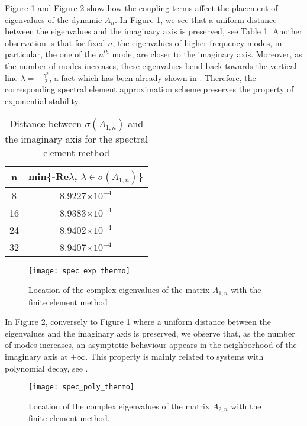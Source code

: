\documentclass [reqno]{amsart}
\begin{document}
Figure 1 and Figure 2 show how the coupling terms affect the placement of eigenvalues of the dynamic $A_{n}$. In Figure 1, we see that a uniform distance between the eigenvalues and the imaginary axis is preserved, see Table 1. Another observation is that for fixed $n$, the eigenvalues of higher frequency modes, in particular, the one of the $n^{th}$ mode, are closer to the imaginary axis. Moreover, as the number of modes increases, these eigenvalues bend back towards the vertical line $\lambda=-\frac{\gamma^2}{2}$, a fact which has been already shown in \cite{KBT1996}. Therefore, the corresponding spectral element approximation scheme preserves the property of exponential stability.
\begin{table}[H]
\begin{center}
\caption{Distance between $\sigma(A_{1,n})$ and the imaginary axis for the spectral element method}
\begin{tabular}{|c|c|} 
\hline
n & min\{-Re$\lambda$, $\lambda\in\sigma(A_{1,n})$\}\\
\hline 
8 & 8.9227$\times 10^{-4}$\\
\hline
16 & 8.9383$\times 10^{-4}$\\
\hline
24 & 8.9402$\times 10^{-4}$\\
\hline
32 & 8.9407$\times 10^{-4}$\\ 
\hline
\end{tabular}
\end{center}
\end{table}
\begin{figure}[H]
\label{fig1}
\begin{center}
\texttt{[image: spec\_exp\_thermo]}
\caption{Location of the complex eigenvalues of the matrix $A_{1,n}$ with the finite element method}
\end{center}
\end{figure}
In Figure 2, conversely to Figure 1 where a uniform distance between the eigenvalues and the imaginary axis is preserved, we observe that, as the number of modes increases, an asymptotic behaviour appears in the neighborhood of the imaginary axis at $\pm\infty$. This property is mainly related to systems with polynomial decay, see \cite{BEPS2006}.
\begin{figure}[H]
\begin{center}
\texttt{[image: spec\_poly\_thermo]}
\caption{Location of the complex eigenvalues of the matrix $A_{2,n}$ with the finite element method.}
\end{center}
\end{figure}
\end{document}
